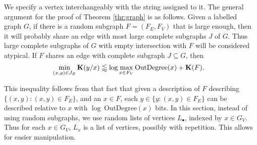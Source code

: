 \documentclass[11pt]{article}\textwidth 6.5in\textheight 9in
\begin{document}
We specify a vertex interchangeably with the string assigned to it. The general argument for the proof of Theorem \ref{thr:graph}  is as follows. Given a labelled graph $G$, if there is a random subgraph $F=(F_E,F_V)$ that is large enough, then it will probably share an edge with most large complete subgraphs $J$ of $G$. Thus large complete subgraphs of $G$ with empty intersection with $F$ will be considered atypical. If $F$ shares an edge with complete subgraph $J\subseteq G$, then 
$$\min_{(x,y)\in J_E}{\mathbf K}(y/x)\lessapprox\log \max_{x\in F_V}\mathrm{OutDegree}(x)+{\mathbf K}(F).$$

This inequality follows from that fact that given a description of $F$ describing $\{(x,y):(x,y)\in F_E\}$, and an $x\in F$, each $y\in \{y:(x,y)\in F_E\}$ can be described relative to $x$ with $\log\ \mathrm{OutDegree}(x)$ bits. In this section, instead of using random subgraphs, we use random lists of vertices $L_\bullet$, indexed by $x\in G_V$. Thus for each $x\in G_V$, $L_x$ is a list of vertices, possibly with repetition. This allows for easier manipulation.
\end{document}

